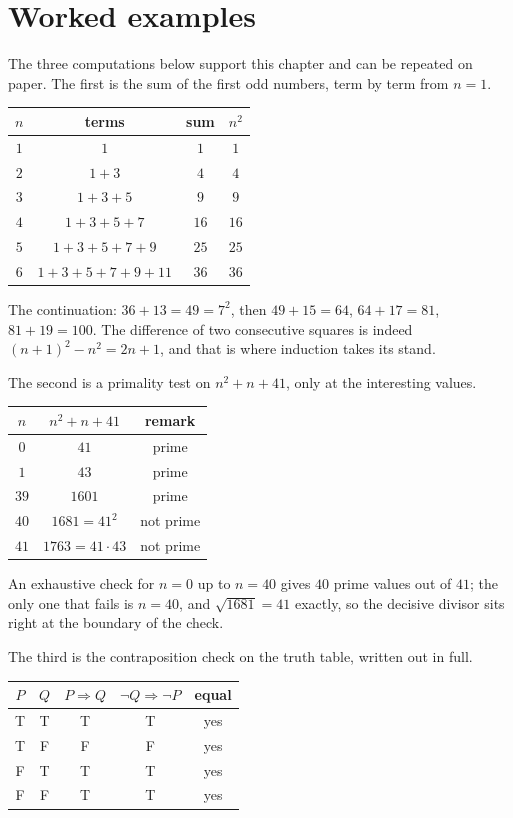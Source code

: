 \section{Worked examples}

The three computations below support this chapter and can be repeated on paper. The first is
the sum of the first odd numbers, term by term from $n = 1$.

{\centering
\begin{tabular}{cccc}
\hline
$n$ & terms & sum & $n^{2}$ \\
\hline
$1$ & $1$ & $1$ & $1$ \\
$2$ & $1+3$ & $4$ & $4$ \\
$3$ & $1+3+5$ & $9$ & $9$ \\
$4$ & $1+3+5+7$ & $16$ & $16$ \\
$5$ & $1+3+5+7+9$ & $25$ & $25$ \\
$6$ & $1+3+5+7+9+11$ & $36$ & $36$ \\
\hline
\end{tabular}\par}

The continuation: $36+13 = 49 = 7^{2}$, then $49+15 = 64$, $64+17 = 81$, $81+19 = 100$.
The difference of two consecutive squares is indeed $(n+1)^{2}-n^{2} = 2n+1$, and that is where induction
takes its stand.

The second is a primality test on $n^{2}+n+41$, only at the interesting values.

{\centering
\begin{tabular}{ccc}
\hline
$n$ & $n^{2}+n+41$ & remark \\
\hline
$0$ & $41$ & prime \\
$1$ & $43$ & prime \\
$39$ & $1601$ & prime \\
$40$ & $1681 = 41^{2}$ & not prime \\
$41$ & $1763 = 41 \cdot 43$ & not prime \\
\hline
\end{tabular}\par}

An exhaustive check for $n = 0$ up to $n = 40$ gives $40$ prime values out of $41$;
the only one that fails is $n = 40$, and $\sqrt{1681} = 41$ exactly, so the decisive
divisor sits right at the boundary of the check.

The third is the contraposition check on the truth table, written out in full.

{\centering
\begin{tabular}{cc|cc|c}
\hline
$P$ & $Q$ & $P \Rightarrow Q$ & $\neg Q \Rightarrow \neg P$ & equal \\
\hline
T & T & T & T & yes \\
T & F & F & F & yes \\
F & T & T & T & yes \\
F & F & T & T & yes \\
\hline
\end{tabular}\par}

